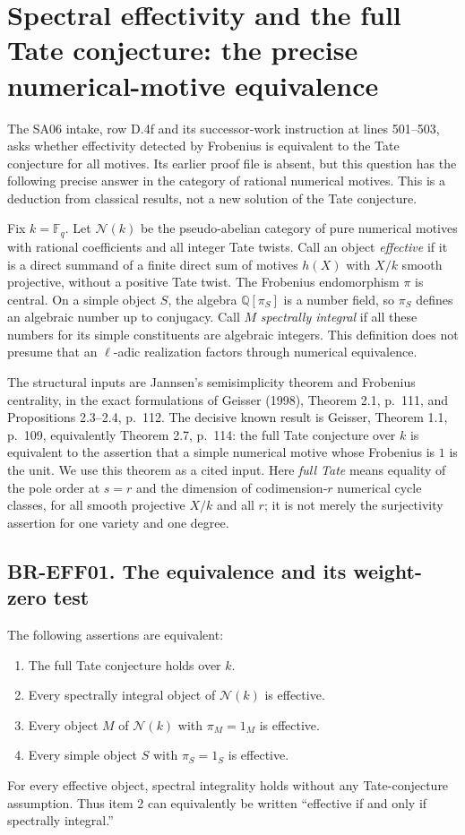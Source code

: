\section{Spectral effectivity and the full Tate conjecture: the precise numerical-motive equivalence}

The SA06 intake, row D.4f and its successor-work instruction at
lines 501--503, asks whether effectivity detected by Frobenius is
equivalent to the Tate conjecture for all motives.  Its earlier proof
file is absent, but this question has the following precise answer in
the category of rational numerical motives.  This is a deduction from
classical results, not a new solution of the Tate conjecture.

Fix $k=\mathbb F_q$.  Let $\mathcal N(k)$ be the pseudo-abelian
category of pure numerical motives with rational coefficients and all
integer Tate twists.  Call an object \emph{effective} if it is a
direct summand of a finite direct sum of motives $h(X)$ with $X/k$
smooth projective, without a positive Tate twist.  The Frobenius
endomorphism $\pi$ is central.  On a simple object $S$, the algebra
$\mathbb Q[\pi_S]$ is a number field, so $\pi_S$ defines an algebraic
number up to conjugacy.  Call $M$ \emph{spectrally integral} if all
these numbers for its simple constituents are algebraic integers.
This definition does not presume that an $\ell$-adic realization
factors through numerical equivalence.

The structural inputs are Jannsen's semisimplicity theorem and
Frobenius centrality, in the exact formulations of Geisser (1998),
Theorem 2.1, p.~111, and Propositions 2.3--2.4, p.~112.
The decisive known result is Geisser, Theorem 1.1, p.~109,
equivalently Theorem 2.7, p.~114: the full Tate conjecture over $k$
is equivalent to the assertion that a simple numerical motive whose
Frobenius is $1$ is the unit.  We use this theorem as a cited input.
Here \emph{full Tate} means equality of the pole order at $s=r$
and the dimension of codimension-$r$ numerical cycle classes, for
all smooth projective $X/k$ and all $r$; it is not merely the
surjectivity assertion for one variety and one degree.

\subsection{BR-EFF01. The equivalence and its weight-zero test}
The following assertions are equivalent:
\begin{enumerate}
\item The full Tate conjecture holds over $k$.
\item Every spectrally integral object of $\mathcal N(k)$ is effective.
\item Every object $M$ of $\mathcal N(k)$ with $\pi_M=1_M$ is effective.
\item Every simple object $S$ with $\pi_S=1_S$ is effective.
\end{enumerate}
For every effective object, spectral integrality holds without
any Tate-conjecture assumption.  Thus item 2 can equivalently be
written ``effective if and only if spectrally integral.''

